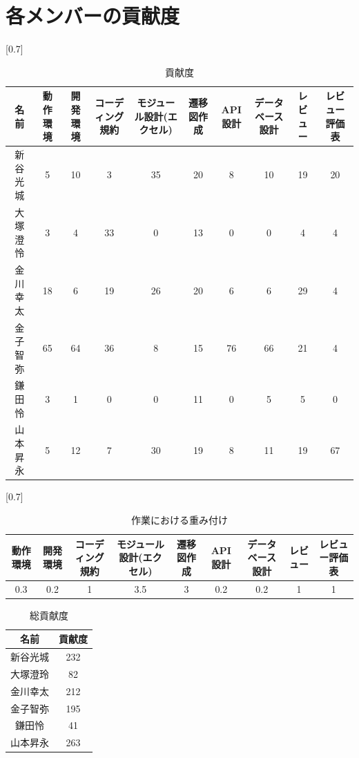 \section{各メンバーの貢献度}
\begin{table}[H]
  \centering
  \caption{貢献度}
  \scalebox{0.7}[0.7]{
  \begin{tabular}{|c|c|c|c|c|c|c|c|c|c|} \hline
      名前 & 動作環境 & 開発環境 & コーディング規約 & モジュール設計(エクセル) & 遷移図作成 & API設計 & データベース設計 & レビュー & レビュー評価表 \\\hline
      新谷光城 & 5 & 10 & 3 & 35 & 20 & 8 & 10 & 19 & 20 \\
      大塚澄怜 & 3 & 4 & 33 & 0 & 13 & 0 & 0 & 4 & 4 \\
      金川幸太 & 18 & 6 & 19 & 26 & 20 & 6 & 6 & 29 & 4 \\
      金子智弥 & 65 & 64 & 36 & 8 & 15 & 76 & 66 & 21 & 4 \\
      鎌田怜 & 3 & 1 & 0 & 0 & 11 & 0 & 5 & 5 & 0 \\
      山本昇永 & 5 & 12 & 7 & 30 & 19 & 8 & 11 & 19 & 67 \\
      \hline
  \end{tabular}
  }
\end{table}

  
  \begin{table}[H]
    \centering
    \caption{作業における重み付け}
    \scalebox{0.7}[0.7]{
    \begin{tabular}{|c|c|c|c|c|c|c|c|c|} \hline
      動作環境 & 開発環境 & コーディング規約 & モジュール設計(エクセル) & 遷移図作成 & API設計 & データベース設計 & レビュー & レビュー評価表 \\ \hline \hline
      0.3 & 0.2 & 1 & 3.5 & 3 & 0.2 & 0.2 & 1 & 1 \\ \hline
    \end{tabular}
    }
\end{table}

\begin{table}[H]
  \centering
  \caption{総貢献度}
    \begin{tabular}{|c|c|} \hline
      名前 & 貢献度 \\ \hline \hline
      新谷光城 & 232 \\ \hline
      大塚澄玲 &  82 \\ \hline
      金川幸太 & 212 \\ \hline
      金子智弥 &  195 \\ \hline
      鎌田怜  &  41 \\ \hline
      山本昇永 &  263 \\ \hline
    \end{tabular}
\end{table}